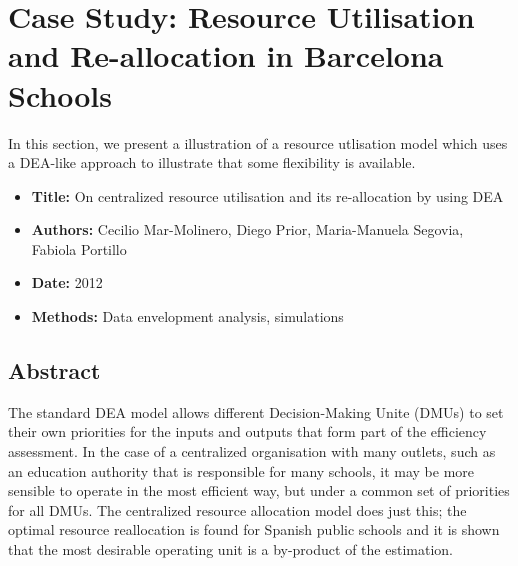 \section{Case Study: Resource Utilisation and Re-allocation in Barcelona Schools}
In this section, we present a illustration of a resource utlisation model which uses a DEA-like approach to illustrate that some flexibility is available.  
\begin{itemize}[noitemsep]
\item \textbf{Title:} On centralized resource utilisation and its re-allocation by using DEA
\item \textbf{Authors:} Cecilio Mar-Molinero,  Diego Prior, Maria-Manuela Segovia, Fabiola Portillo 
\item \textbf{Date:} 2012
\item \textbf{Methods:} Data envelopment analysis, simulations
\end{itemize}
\subsection*{Abstract} The standard DEA model allows different Decision-Making Unite (DMUs) to set their own priorities for the inputs and outputs that form part of the efficiency assessment. In the case of a centralized organisation with many outlets, such as an education authority that is responsible for many schools, it may be more sensible to operate in the most efficient way, but under a common set of priorities for all DMUs. The centralized resource allocation model does just this; the optimal resource reallocation is found for Spanish public schools and it is shown that the most desirable operating unit is a by-product of the estimation. 
